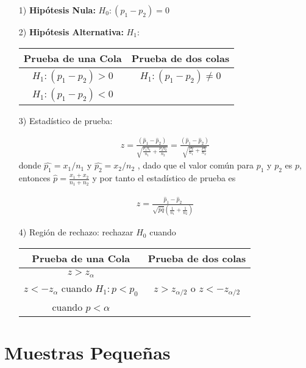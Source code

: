 \begin{itemize}
\item[1) ] \textbf{Hip\'otesis Nula:}  $H_{0}:\left(p_{1}-p_{2}\right)=0$
\item[2) ] \textbf{Hip\'otesis Alternativa: }  $H_{1}:$

\begin{tabular}{cc}\hline
\textbf{Prueba de una Cola} & \textbf{Prueba de dos colas}\\\hline
$H_{1}:\left(p_{1}-p_{2}\right)>0$ & $H_{1}:\left(p_{1}-p_{2}\right)\neq 0$\\ 
$H_{1}:\left(p_{1}-p_{2}\right)<0$&\\
\end{tabular}

\item[3) ] Estad\'istico de prueba:

\begin{eqnarray*}
z=\frac{\left(\hat{p}_{1}-\hat{p}_{2}\right)}{\sqrt{\frac{p_{1}q_{1}}{n_{1}}+\frac{p_{2}q_{2}}{n_{2}}}}=\frac{\left(\hat{p}_{1}-\hat{p}_{2}\right)}{\sqrt{\frac{pq}{n_{1}}+\frac{pq}{n_{2}}}}
\end{eqnarray*}
donde $\hat{p_{1}}=x_{1}/n_{1}$ y $\hat{p_{2}}=x_{2}/n_{2}$ , dado que el valor com\'un para $p_{1}$ y $p_{2}$ es $p$, entonces $\hat{p}=\frac{x_{1}+x_{2}}{n_{1}+n_{2}}$ y por tanto el estad\'istico de prueba es

\begin{eqnarray*}
z=\frac{\hat{p}_{1}-\hat{p}_{2}}{\sqrt{\hat{p}\hat{q}}\left(\frac{1}{n_{1}}+\frac{1}{n_{2}}\right)}
\end{eqnarray*}

\item[4) ] Regi\'on de rechazo: rechazar $H_{0}$ cuando

\begin{tabular}{cc}\hline
\textbf{Prueba de una Cola} & \textbf{Prueba de dos colas}\\\hline
$z>z_{\alpha}$ & \\
$z<-z_{\alpha}$ cuando $H_{1}:p<p_{0}$&$z>z_{\alpha/2}$ o $z<-z_{\alpha/2}$\\
 cuando $p<\alpha$&\\
\end{tabular}
\end{itemize}


\section{Muestras Peque\~nas}

